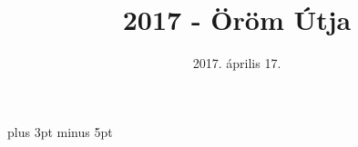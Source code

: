 \documentclass[a5paper,twoside]{article}
\title{2017 - Öröm Útja}
\date{2017. április 17.}
\begin{document}
  \begin{titlepage}
    \setlength{\oddsidemargin}{-1.6cm}
    \vspace*{6cm}
    {\let\newpage\relax\maketitle}
  \end{titlepage}


  \versesep=12pt plus 3pt minus 5pt

  \begin{songs}{}
    
    
    
    
    
    
  \end{songs}

  
\end{document}

